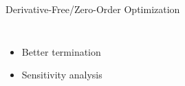 \documentclass[handout,aspectratio=54]{beamer}
\numberwithin{theorem}{section}
\begin{document}
\begin{frame}{Derivative-Free/Zero-Order Optimization}
\begin{columns}
\begin{itemize}
\item Better termination

\item Sensitivity analysis
\end{itemize}
\end{columns}
\end{frame}
\end{document}
